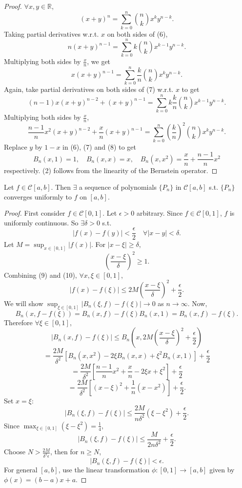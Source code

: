 \documentclass{functionspaces}
\begin{document}
\begin{proof}
$\forall x,y \in \mathbb{R}$,
\[
(x+y)^{n} = \sum_{k=0}^{n}\binom{n}{k}x^{k}y^{n-k}. \tag{6}
\]
Taking partial derivatives w.r.t. $x$ on both sides of (6),
\[
n(x+y)^{n-1} = \sum_{k=0}^{n}k\binom{n}{k}x^{k-1}y^{n-k}.
\]
Multiplying both sides by $\frac{x}{n}$, we get
\[
x(x+y)^{n-1} = \sum_{k=0}^{n}\frac{k}{n}\binom{n}{k}x^{k}y^{n-k}. \tag{7}
\]
Again, take partial derivatives on both sides of (7) w.r.t. $x$ to get
\[
(n-1)x(x+y)^{n-2} + (x+y)^{n-1} = \sum_{k=0}^{n}k\frac{k}{n}\binom{n}{k}x^{k-1}y^{n-k}.
\]
Multiplying both sides by $\frac{x}{n}$,
\[
\frac{n-1}{n}x^{2}(x+y)^{n-2} + \frac{x}{n}(x+y)^{n-1} = \sum_{k=0}^{n}\left(\frac{k}{n}\right)^{2}\binom{n}{k}x^{k}y^{n-k}. \tag{8}
\]
Replace $y$ by $1-x$ in (6), (7) and (8) to get
\[
B_{n}(x,1) = 1, \quad B_{n}(x,x) = x, \quad B_{n}(x,x^{2}) = \frac{x}{n} + \frac{n-1}{n}x^{2}
\]
respectively. (2) follows from the linearity of the Bernstein operator.
\end{proof}

\begin{theorem}
Let $f \in \mathcal{C}[a,b]$. Then $\exists$ a sequence of polynomials $\{P_{n}\}$ in $\mathcal{C}[a,b]$ s.t. $\{P_{n}\}$ converges uniformly to $f$ on $[a,b]$.
\end{theorem}

\begin{proof}
First consider $f \in \mathcal{C}[0,1]$. Let $\epsilon > 0$ arbitrary. Since $f \in \mathcal{C}[0,1]$, $f$ is uniformly continuous. So $\exists \delta > 0$ s.t.
\[
|f(x) - f(y)| < \frac{\epsilon}{2} \quad \forall |x-y| < \delta. \tag{9}
\]
Let $M = \sup_{x\in[0,1]}|f(x)|$. For $|x-\xi| \geq \delta$,
\[
\left(\frac{x-\xi}{\delta}\right)^{2} \geq 1. \tag{10}
\]
Combining (9) and (10), $\forall x,\xi \in [0,1]$,
\[
|f(x) - f(\xi)| \leq 2M\left(\frac{x-\xi}{\delta}\right)^{2} + \frac{\epsilon}{2}.
\]
We will show $\sup_{\xi\in[0,1]}|B_{n}(\xi,f) - f(\xi)| \to 0$ as $n \to \infty$. Now,
\[
B_{n}(x,f-f(\xi)) = B_{n}(x,f) - f(\xi)B_{n}(x,1) = B_{n}(x,f) - f(\xi).
\]
Therefore $\forall \xi \in [0,1]$,
\[
|B_{n}(x,f) - f(\xi)| \leq B_{n}\left(x,2M\left(\frac{x-\xi}{\delta}\right)^{2} + \frac{\epsilon}{2}\right)
\]
\[
= \frac{2M}{\delta^{2}}\left[B_{n}(x,x^{2}) - 2\xi B_{n}(x,x) + \xi^{2}B_{n}(x,1)\right] + \frac{\epsilon}{2}
\]
\[
= \frac{2M}{\delta^{2}}\left[\frac{n-1}{n}x^{2} + \frac{x}{n} - 2\xi x + \xi^{2}\right] + \frac{\epsilon}{2}
\]
\[
= \frac{2M}{\delta^{2}}\left[(x-\xi)^{2} + \frac{1}{n}(x-x^{2})\right] + \frac{\epsilon}{2}.
\]
Set $x = \xi$:
\[
|B_{n}(\xi,f) - f(\xi)| \leq \frac{2M}{n\delta^{2}}(\xi - \xi^{2}) + \frac{\epsilon}{2}.
\]
Since $\max_{\xi\in[0,1]}(\xi - \xi^{2}) = \frac{1}{4}$,
\[
|B_{n}(\xi,f) - f(\xi)| \leq \frac{M}{2n\delta^{2}} + \frac{\epsilon}{2}.
\]
Choose $N > \frac{2M}{\delta^{2}\epsilon}$, then for $n \geq N$,
\[
|B_{n}(\xi,f) - f(\xi)| < \epsilon.
\]
For general $[a,b]$, use the linear transformation $\phi:[0,1] \to [a,b]$ given by $\phi(x) = (b-a)x + a$.
\end{proof}
\end{document}
